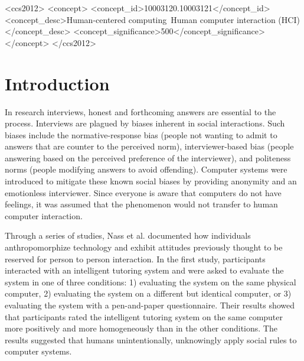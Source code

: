 \documentclass{sig-alternate-05-2015}
\begin{document}
\begin{CCSXML}
<ccs2012>
<concept>
<concept_id>10003120.10003121</concept_id>
<concept_desc>Human-centered computing~Human computer interaction (HCI)</concept_desc>
<concept_significance>500</concept_significance>
</concept>
</ccs2012>
\end{CCSXML}



%
%

\section{Introduction}
In research interviews, honest and forthcoming answers are essential to the process. Interviews are plagued by biases inherent in social interactions. Such biases include the normative-response bias (people not wanting to admit to answers that are counter to the perceived norm), interviewer-based bias (people answering based on the perceived preference of the interviewer), and politeness norms (people modifying answers to avoid offending). Computer systems were introduced to mitigate these known social biases by providing anonymity and an emotionless interviewer.  Since everyone is aware that computers do not have feelings, it was assumed that the phenomenon would not transfer to human computer interaction. 

Through a series of studies, Nass et al. documented how individuals anthropomorphize technology and exhibit attitudes previously thought to be reserved for person to person interaction\cite{nass1999people}\cite{reeves1996people}.  In the first study, participants interacted with an intelligent tutoring system and were asked to evaluate the system in one of three conditions: 1) evaluating the system on the same physical computer, 2) evaluating the system on a different but identical computer, or 3) evaluating the system with a pen-and-paper questionnaire. Their results showed that participants rated the intelligent tutoring system on the same computer more positively and more homogeneously than in the other conditions. The results suggested that humans unintentionally, unknowingly apply social rules to computer systems.  
\end{document}
